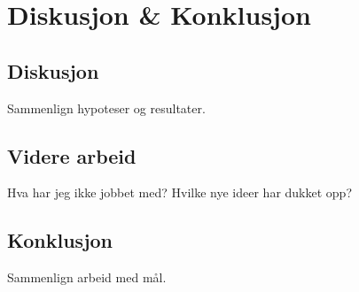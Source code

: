 \section[Diskusjon \& Konklusjon]{Diskusjon \& Konklusjon}
\subsection{Diskusjon}
{\color{red}Sammenlign hypoteser og resultater.}

\subsection{Videre arbeid}
{\color{red}Hva har jeg ikke jobbet med? Hvilke nye ideer har dukket opp?}

\subsection{Konklusjon}
{\color{red}Sammenlign arbeid med mål.}